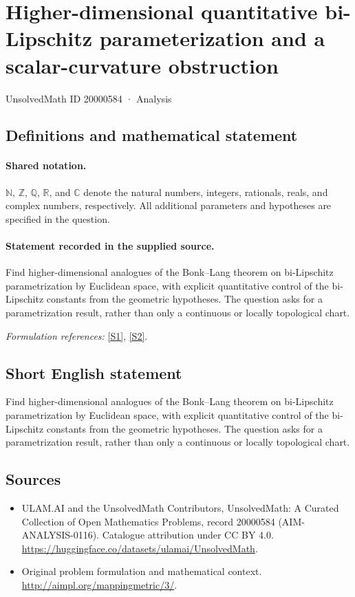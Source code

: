 \documentclass[11pt]{article}
\newcommand{\sref}[2]{\hyperlink{source:#1:#2}{[S#2]}}
\begin{document}
\setcounter{section}{20000583}
\section{Higher-dimensional quantitative bi-Lipschitz parameterization and a scalar-curvature obstruction}\label{20000584}
{\small UnsolvedMath ID 20000584 · Analysis}
\subsection{Definitions and mathematical statement}

\paragraph{Shared notation.}$\mathbb N$, $\mathbb Z$, $\mathbb Q$, $\mathbb R$, and $\mathbb C$ denote the natural numbers, integers, rationals, reals, and complex numbers, respectively. All additional parameters and hypotheses are specified in the question.


\paragraph{Statement recorded in the supplied source.}
Find higher-dimensional analogues of the Bonk--Lang theorem on bi-Lipschitz parametrization by Euclidean space, with explicit quantitative control of the bi-Lipschitz constants from the geometric hypotheses. The question asks for a parametrization result, rather than only a continuous or locally topological chart.
\par\smallskip\textit{Formulation references:} \sref{20000584}{1}, \sref{20000584}{2}.
\subsection{Short English statement}
Find higher-dimensional analogues of the Bonk--Lang theorem on bi-Lipschitz parametrization by Euclidean space, with explicit quantitative control of the bi-Lipschitz constants from the geometric hypotheses. The question asks for a parametrization result, rather than only a continuous or locally topological chart.
\subsection{Sources}
\begin{itemize}
\item[\hypertarget{source:20000584:1}{S1}] ULAM.AI and the UnsolvedMath Contributors, UnsolvedMath: A Curated Collection of Open Mathematics Problems, record 20000584 (AIM-ANALYSIS-0116). Catalogue attribution under CC BY 4.0.
\url{https://huggingface.co/datasets/ulamai/UnsolvedMath}.
\item[\hypertarget{source:20000584:2}{S2}] Original problem formulation and mathematical context.
\url{http://aimpl.org/mappingmetric/3/}.
\end{itemize}
\label{end:20000584}
\end{document}
